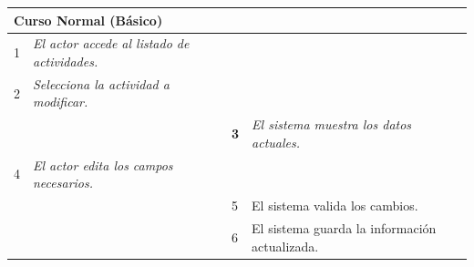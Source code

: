     \begin{table}[H]
        \begin{tabular}{llllllll}
        \hline
        \multicolumn{8}{|l|}{\cellcolor[HTML]{F2F2F2}Curso Normal (Básico)}                                                                                                                                                                                                                                                                          \\ \hline
        \multicolumn{1}{|c|}{1}  & \multicolumn{1}{l|}{{\color[HTML]{808080} \textit{El actor accede al listado de actividades.}}} & \multicolumn{1}{l|}{{\color[HTML]{808080} }}                    & \multicolumn{5}{l|}{{\color[HTML]{808080} }}                                                                                            \\ \hline
        \multicolumn{1}{|c|}{2}   & \multicolumn{1}{p{6cm}|}{{\color[HTML]{808080} \textit{Selecciona la actividad a modificar.}}}                                                 & \multicolumn{1}{c|}{} & \multicolumn{5}{p{6cm}|}{{\color[HTML]{808080} \textit{}}}                         \\ \hline
        \multicolumn{1}{|l|}{}   & \multicolumn{1}{l|}{{\color[HTML]{808080} }}                                                          & \multicolumn{1}{l|}{{\color[HTML]{808080} \textbf{3}}}          & \multicolumn{5}{p{6cm}|}{{\color[HTML]{808080} \textit{El sistema muestra los datos actuales.}}} \\ \hline
        \multicolumn{1}{|c|}{4}  & \multicolumn{1}{p{6cm}|}{{\color[HTML]{808080} \textit{El actor edita los campos necesarios.}}} & \multicolumn{1}{l|}{{\color[HTML]{808080} }}                    & \multicolumn{5}{l|}{{\color[HTML]{808080} }}                                                                                            \\ \hline
        \multicolumn{1}{|l|}{}   & \multicolumn{1}{l|}{{\color[HTML]{808080} }}                                                          & \multicolumn{1}{l|}{{\color[HTML]{808080} 5}}                   & \multicolumn{5}{p{6cm}|}{{\color[HTML]{808080} El sistema valida los cambios.}}                                  \\ \hline
        \multicolumn{1}{|l|}{}   & \multicolumn{1}{l|}{{\color[HTML]{808080} }}                                                          & \multicolumn{1}{l|}{{\color[HTML]{808080} 6}}                   & \multicolumn{5}{p{6cm}|}{{\color[HTML]{808080} El sistema guarda la información actualizada.}}                                  \\ \hline
        \end{tabular}
    \end{table}

